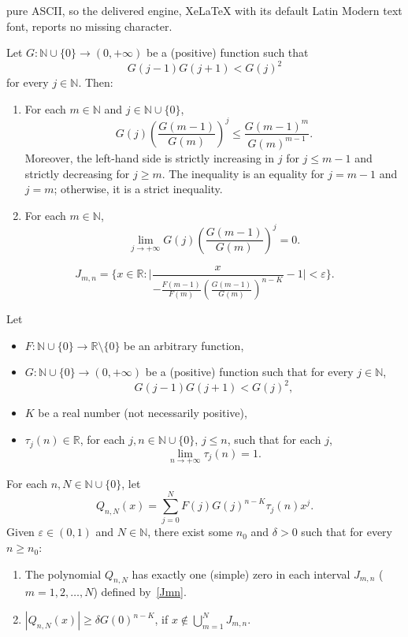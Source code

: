 \documentclass[10pt,a4paper]{amsart}
\newcommand{\NN}{\mathbb{N}}
\newcommand{\RR}{\mathbb{R}}
\newcommand{\eps}{\varepsilon}
\begin{document}
pure ASCII, so the delivered engine, XeLaTeX with its default Latin Modern text font, reports no missing character.
\begin{Lem}
\label{lemaG}
Let $G : \NN \cup \{0\} \to (0,+\infty)$ be a (positive) function such that
\[
  G(j-1) G(j+1) < G(j)^2
\]
for every $j \in \NN$. Then:
\begin{enumerate}
\item\label{Gj}
For each $m \in \NN$ and $j \in \NN \cup \{0\}$,
\[
  G(j) \left(\frac{G(m-1)}{G(m)}\right)^j
  \le \frac{G(m-1)^m}{G(m)^{m-1}}.
\]
Moreover, the left-hand side is strictly increasing in $j$ for $j \le m-1$ and strictly decreasing for $j \ge m$. The inequality is an equality for $j = m-1$ and $j = m$; otherwise, it is a strict inequality.

\item\label{limite0}
For each $m \in \NN$,
\[
  \lim_{j \to +\infty} G(j) \left(\frac{G(m-1)}{G(m)}\right)^j = 0.
\]
\end{enumerate}
\end{Lem}

\begin{equation}
\label{Jmn}
  J_{m,n} = \Bigg\{ x \in \RR : \Bigg| \frac{x}{-\frac{F(m-1)}{F(m)} 
   \left(\frac{G(m-1)}{G(m)}\right)^{n-K}} - 1 \Bigg| < \eps
  \Bigg\}.
\end{equation}

\begin{Lem}
\label{lemaQn>d}
Let
\begin{itemize}
\item $F : \NN \cup \{0\} \to \RR \setminus \{0\}$ be an arbitrary function,

\item $G : \NN \cup \{0\} \to (0,+\infty)$ be a (positive) function such that for every $j \in \NN$,
\[
  G(j-1) G(j+1) < G(j)^2,
\]

\item $K$ be a real number (not necessarily positive),

\item $\tau_j(n) \in \RR$, for each $j, n \in \NN \cup \{0\}$, $j \le n$, such that for each $j$,
\[
  \lim_{n \to +\infty} \tau_j(n) = 1.
\]
\end{itemize}
For each $n, N \in \NN \cup \{0\}$, let
\[
  Q_{n,N}(x) = \sum_{j=0}^N F(j) G(j)^{n-K} \tau_j(n) x^j.
\]
Given $\eps \in (0,1)$ and $N \in \NN$, there exist some $n_0$ and $\delta > 0$ such that for every $n \ge n_0$:
\begin{enumerate}
\item
The polynomial $Q_{n,N}$ has exactly one (simple) zero in each interval $J_{m,n}$ ($m=1,2,\dots,N$) defined by~\eqref{Jmn}.

\item
$|Q_{n,N}(x)| \ge \delta G(0)^{n-K}$, if $x \notin \bigcup_{m=1}^N J_{m,n}$.
\end{enumerate}
\end{Lem}
\end{document}
